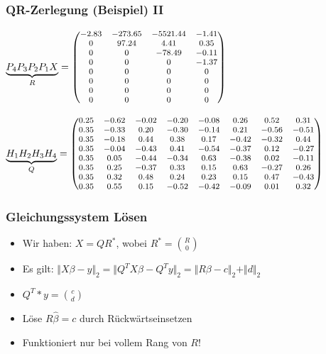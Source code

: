 \documentclass{beamer}
\begin{document}
\begin{frame}
  \frametitle{QR-Zerlegung (Beispiel) II}
  $\underbrace{P_4 P_3 P_2 P_1 X}_{R} = \footnotesize \begin{pmatrix}
    -2.83 & -273.65 & -5521.44 & -1.41 \\
    0 & 97.24 & 4.41 & 0.35 \\
    0 & 0 & -78.49 & -0.11 \\
    0 & 0 & 0 & -1.37 \\
    0 & 0 & 0 & 0 \\
    0 & 0 & 0 & 0 \\
    0 & 0 & 0 & 0 \\
    0 & 0 & 0 & 0 \\
  \end{pmatrix}$
  
  \vspace{1cm}
  \pause

  $\underbrace{H_1  H_2  H_3  H_4}_{Q} = \nobreak
  \footnotesize
  \begin{pmatrix}
    0.25 & -0.62 & -0.02 & -0.20 & -0.08 & 0.26 & 0.52 & 0.31 \\
    0.35 & -0.33 & 0.20 & -0.30 & -0.14 & 0.21 & -0.56 & -0.51 \\
    0.35 & -0.18 & 0.44 & 0.38 & 0.17 &	-0.42 &	-0.32 &	0.44 \\
    0.35 & -0.04 & -0.43 & 0.41 & -0.54 & -0.37 & 0.12 & -0.27 \\
    0.35 & 0.05 & -0.44 & -0.34 & 0.63 & -0.38 & 0.02 & -0.11 \\
    0.35 & 0.25 & -0.37 & 0.33 & 0.15 & 0.63 & -0.27 & 0.26 \\
    0.35 & 0.32 & 0.48 & 0.24 & 0.23 & 0.15 & 0.47 & -0.43 \\
    0.35 & 0.55 & 0.15 & -0.52 & -0.42 & -0.09 & 0.01 & 0.32 
  \end{pmatrix}$
\end{frame}

\begin{frame}
  \frametitle{Gleichungssystem Lösen}
  
  \begin{itemize}
  \item Wir haben: $X = QR^*$, wobei $R^* = \binom{R}{0}$
  \item Es gilt: $\Vert X\beta - y \Vert_2 = \Vert Q^T X \beta - Q^T y \Vert_2 = \Vert R \beta - c \Vert_2 + \Vert d \Vert_2$
  \item $Q^T * y = \binom{c}{d}$
  \item Löse $R \hat{\beta} = c$ durch Rückwärtseinsetzen

  \pause

  \item Funktioniert nur bei vollem Rang von $R$!
  \end{itemize}

\end{frame}
\end{document}
